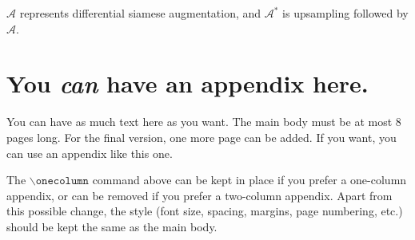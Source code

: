 \documentclass{article}
\theoremstyle{plain}
\theoremstyle{definition}
\theoremstyle{remark}
\begin{document}
$\mathcal{A}$ represents differential siamese augmentation, and $\mathcal{A}^*$ is upsampling followed by $\mathcal{A}$.






\nocite{langley00}





\newpage
\appendix
\onecolumn
\section{You \emph{can} have an appendix here.}

You can have as much text here as you want. The main body must be at most $8$ pages long.
For the final version, one more page can be added.
If you want, you can use an appendix like this one.  

The $\mathtt{\backslash onecolumn}$ command above can be kept in place if you prefer a one-column appendix, or can be removed if you prefer a two-column appendix.  Apart from this possible change, the style (font size, spacing, margins, page numbering, etc.) should be kept the same as the main body.
\end{document}
